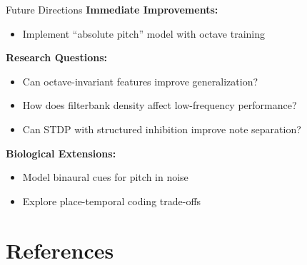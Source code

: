 \documentclass[aspectratio=169,20pt]{beamer}
\begin{document}
\begin{frame}{Future Directions}
\textbf{Immediate Improvements:}
\begin{itemize}
    \item Implement ``absolute pitch'' model with octave training
\end{itemize}

\vspace{0.3cm}
\textbf{Research Questions:}
\begin{itemize}
    \item Can octave-invariant features improve generalization?
    \item How does filterbank density affect low-frequency performance?
    \item Can STDP with structured inhibition improve note separation?
\end{itemize}

\vspace{0.3cm}
\textbf{Biological Extensions:}
\begin{itemize}
    \item Model binaural cues for pitch in noise
    \item Explore place-temporal coding trade-offs
\end{itemize}
\end{frame}

\section*{References}
\end{document}
